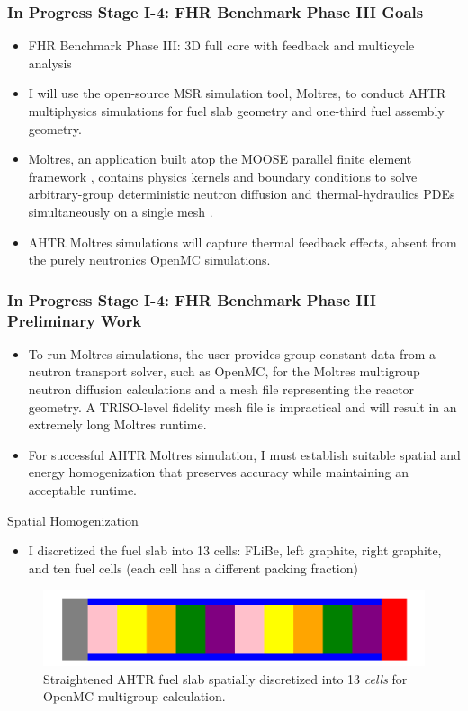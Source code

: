 \begin{frame}
    \frametitle{In Progress Stage I-4: FHR Benchmark Phase III Goals}
    \begin{itemize}
        \item FHR Benchmark Phase III: 3D full core with feedback and multicycle 
        analysis
        \item I will use the open-source MSR simulation tool, Moltres, to conduct
        AHTR multiphysics simulations for fuel slab geometry and one-third 
        fuel assembly geometry. 
        \item Moltres, an application built atop the 
        \gls{MOOSE} parallel finite element framework \cite{gaston_moose:_2009}, 
        contains physics kernels and boundary conditions to solve arbitrary-group 
        deterministic neutron diffusion and thermal-hydraulics \glspl{PDE} 
        simultaneously on a single mesh \cite{lindsay_introduction_2018,park_advancement_2020}. 
        \item AHTR Moltres simulations will capture thermal feedback effects, 
        absent from the purely neutronics OpenMC simulations.  
    \end{itemize}
\end{frame}

\begin{frame}
    \frametitle{In Progress Stage I-4: FHR Benchmark Phase III Preliminary Work}
    \begin{itemize}
        \item To run Moltres simulations, the user provides group constant data from a neutron 
        transport solver, such as OpenMC, for the Moltres multigroup neutron diffusion 
        calculations and a mesh file representing the reactor geometry. 
        A TRISO-level fidelity mesh file is impractical and will result in an extremely 
        long Moltres runtime. 
        \item For successful AHTR Moltres simulation, I must establish 
        suitable spatial and energy homogenization that preserves accuracy while 
        maintaining an acceptable runtime.
    \end{itemize}
\begin{block}{Spatial Homogenization}
    \begin{itemize}
        \item I discretized the fuel slab into 13 cells: FLiBe, left graphite, right graphite, 
    and ten fuel cells (each cell has a different packing fraction)
    \end{itemize}
    \vspace{-0.3cm}
    \begin{figure}[]
        \includegraphics[width=0.6\linewidth]{../docs/figures/straightened_slab_mg.png}
        \caption{Straightened AHTR fuel slab spatially discretized into 
        13 \textit{cells} for OpenMC multigroup calculation.}
    \end{figure}
\end{block}
\end{frame}

